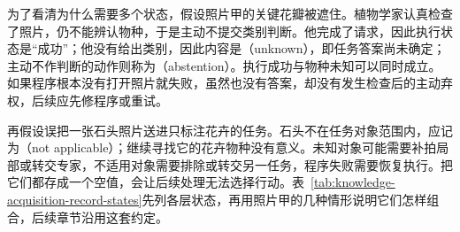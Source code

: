 为了看清为什么需要多个状态，假设照片甲的关键花瓣被遮住。植物学家认真检查了照片，仍不能辨认物种，于是主动不提交类别判断。他完成了请求，因此执行状态是“成功”；他没有给出类别，因此内容是（unknown），即任务答案尚未确定；主动不作判断的动作则称为（abstention）。执行成功与物种未知可以同时成立。如果程序根本没有打开照片就失败，虽然也没有答案，却没有发生检查后的主动弃权，后续应先修程序或重试。

再假设误把一张石头照片送进只标注花卉的任务。石头不在任务对象范围内，应记为（not applicable）；继续寻找它的花卉物种没有意义。未知对象可能需要补拍局部或转交专家，不适用对象需要排除或转交另一任务，程序失败需要恢复执行。把它们都存成一个空值，会让后续处理无法选择行动。表~\ref{tab:knowledge-acquisition-record-states}先列各层状态，再用照片甲的几种情形说明它们怎样组合，后续章节沿用这套约定。

